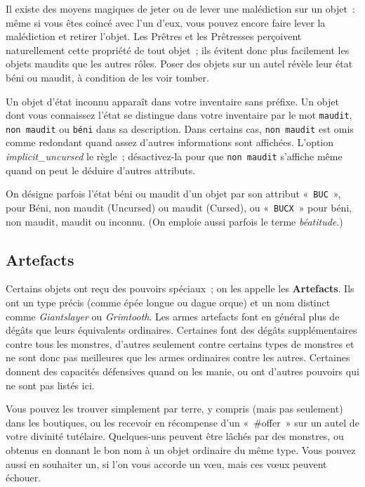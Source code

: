 \documentclass[titlepage]{article}
\begin{document}
Il existe des moyens magiques de jeter ou de lever une malédiction sur un
objet~: même si vous êtes coincé avec l'un d'eux, vous pouvez encore faire
lever la malédiction et retirer l'objet.
Les Prêtres et les Prêtresses perçoivent naturellement cette propriété de
tout objet~; ils évitent donc plus facilement les objets maudits que les
autres rôles.
Poser des objets sur un autel révèle leur état béni ou maudit, à condition
de les voir tomber.


Un objet d'état inconnu apparaît dans votre inventaire sans préfixe.
Un objet dont vous connaissez l'état se distingue dans votre inventaire par
le mot \texttt{maudit}, \texttt{non maudit} ou \texttt{béni} dans sa
description.
Dans certains cas, \texttt{non maudit} est omis comme redondant quand assez
d'autres informations sont affichées.
L'option
\textit{implicit\_uncursed}
le règle~; désactivez-la pour que \texttt{non maudit} s'affiche même quand on
peut le déduire d'autres attributs.


On désigne parfois l'état béni ou maudit d'un objet par son attribut
«~\texttt{BUC}~», pour Béni, non maudit (Uncursed) ou maudit (Cursed),
ou «~\texttt{BUCX}~» pour béni, non maudit, maudit ou inconnu.
(On emploie aussi parfois le terme \textit{béatitude}.)

\subsection{Artefacts}



Certains objets ont reçu des pouvoirs spéciaux~; on les appelle les
\textbf{Artefacts}.
Ils ont un type précis (comme épée longue ou dague orque) et un nom
distinct comme \textit{Giantslayer} ou \textit{Grimtooth}.
Les armes artefacts font en général plus de dégâts que leurs équivalents
ordinaires.
Certaines font des dégâts supplémentaires contre tous les monstres,
d'autres seulement contre certains types de monstres et ne sont donc pas
meilleures que les armes ordinaires contre les autres.
Certaines donnent des capacités défensives quand on les manie, ou ont
d'autres pouvoirs qui ne sont pas listés ici.


Vous pouvez les trouver simplement par terre, y compris (mais pas
seulement) dans les boutiques, ou les recevoir en récompense d'un
«~\#offer~» sur un autel de votre divinité tutélaire.
Quelques-uns peuvent être lâchés par des monstres, ou obtenus en donnant le
bon nom à un objet ordinaire du même type.
Vous pouvez aussi en souhaiter un, si l'on vous accorde un vœu, mais ces
vœux peuvent échouer.
\end{document}
